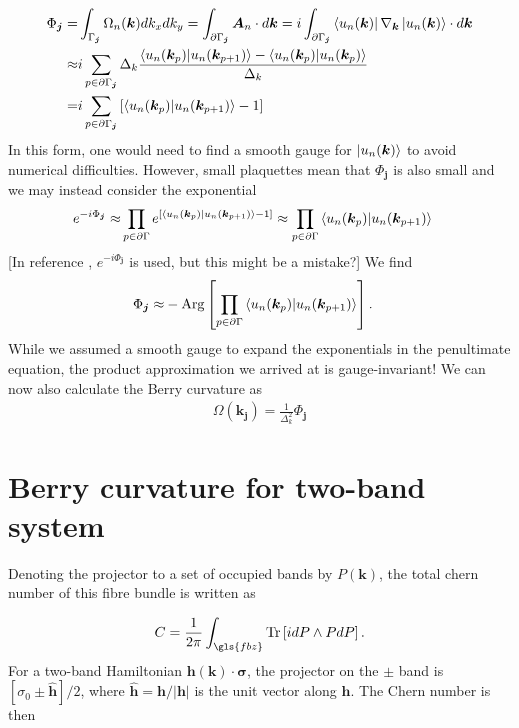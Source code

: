 \documentclass[english]{scrartcl}
\begin{document}
\begin{align*}
\Phi_{\bm j} =& \int_{\Gamma_{\bm j}} \Omega_{n}(\bm k) d k_x d k_y = \int_{\partial \Gamma _{\bm j}} \bm A_n \cdot d \bm k
= i \int_{\partial \Gamma _{\bm j}} \bra{u_n(\bm k)} \nabla_{\bm k} \ket{u_n(\bm k)} \cdot d \bm k \\
\approx& i\sum_{p \in \partial \Gamma_{\bm j}} \Delta_k \frac{\braket{u_n(\bm k_p) | u_n(\bm k_{p+1})} - \braket{u_n(\bm k_p) | u_n(\bm k_p)}}{\Delta_k} \\
=& i \sum_{p \in \partial \Gamma_{\bm j}} \left[  \braket{u_n(\bm k_p) | u_n(\bm k_{p+1})} - 1\right]
\end{align*}
In this form, one would need to find a smooth gauge for $\ket{u_n(\bm k)}$ to avoid numerical difficulties. However, small plaquettes mean that $\Phi_{\bm j}$ is also small and we may instead consider the exponential
\begin{align*}
e^{-i \Phi_{\bm j}} \approx& \prod_{p \in \partial \Gamma}e^{\left[\braket{u_n(\bm k_p) | u_n(\bm k_{p+1})} - 1\right]} \approx \prod_{p \in \partial \Gamma}\braket{u_n(\bm k_p) | u_n(\bm k_{p+1})} 
\end{align*}
[In reference \cite{chern_number_notes}, $e^{-i \Phi_{\bm j}}$ is used, but this might be a mistake?] We find
\begin{align}
\Phi_{\bm j} \approx& - \text{Arg}\left [\prod_{p \in \partial \Gamma}\braket{u_n(\bm k_p) | u_n(\bm k_{p+1})} \right].
\end{align} 
While we assumed a smooth gauge to expand the exponentials in the penultimate equation, the product approximation we arrived at is gauge-invariant! We can now also calculate the Berry curvature as 
\begin{align}
\Omega(\bm k_{\bm j}) = \frac{1}{\Delta_k^2}\Phi_{\bm j} 
\end{align} 

\section{Berry curvature for two-band system}
Denoting the projector to a set of occupied bands by $P(\bm k)$, the total chern number of this fibre bundle is written as

\begin{align}
C = \frac{1}{2 \pi} \int_{\gls{fbz}} \mathrm{Tr} \left[ i d P \wedge P d P\right].
\end{align}
For a two-band Hamiltonian $\bm h(\bm k) \cdot \bm \sigma$, the projector on the $\pm$ band is $[\sigma_0 \pm \bm {\hat  h}]/2$, where $\bm {\hat  h} = \bm h / |\bm h|$ is the unit vector along $\bm h$. The Chern number is then 
\end{document}
